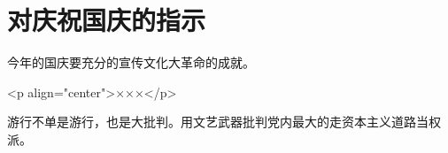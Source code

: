 \section[对庆祝国庆的指示（一九六七年九月）]{对庆祝国庆的指示}


今年的国庆要充分的宣传文化大革命的成就。

<p align="center">×××</p>

游行不单是游行，也是大批判。用文艺武器批判党内最大的走资本主义道路当权派。


